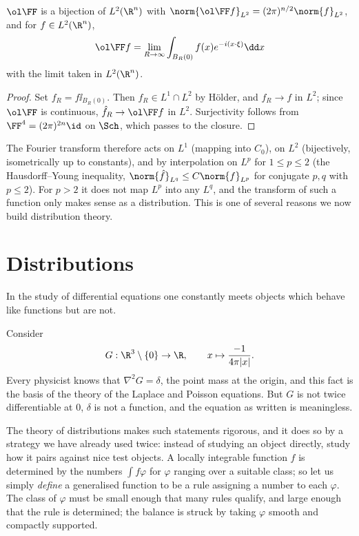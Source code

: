 \begin{proposition}
	$\ol\FF$ is a bijection of $L^2(\R^n)$ with $\norm{\ol\FF f}_{L^2}=(2\pi)^{n/2}\norm{f}_{L^2}$, and for $f \in L^2(\R^n)$,
	$$\ol\FF f = \lim_{R\to\infty}\int_{B_R(0)}f(x)e^{-i(x\cdot\xi)}\dd x$$
	with the limit taken in $L^2(\R^n)$.
\end{proposition}

\begin{proof}
	Set $f_R = f\ii_{B_R(0)}$. Then $f_R \in L^1 \cap L^2$ by H\"older, and $f_R \to f$ in $L^2$; since $\ol\FF$ is continuous, $\hat f_R \to \ol\FF f$ in $L^2$. Surjectivity follows from $\FF^4 = (2\pi)^{2n}\id$ on $\Sch$, which passes to the closure.
\end{proof}

\begin{remark}
	The Fourier transform therefore acts on $L^1$ (mapping into $C_0$), on $L^2$ (bijectively, isometrically up to constants), and by interpolation on $L^p$ for $1 \le p \le 2$ (the Hausdorff--Young inequality, $\norm{\hat f}_{L^q}\le C\norm{f}_{L^p}$ for conjugate $p,q$ with $p \le 2$). For $p > 2$ it does not map $L^p$ into any $L^q$, and the transform of such a function only makes sense as a distribution. This is one of several reasons we now build distribution theory.
\end{remark}

\section{Distributions}\label{sec:dist}

In the study of differential equations one constantly meets objects which behave like functions but are not.

\begin{example}\label{ex:greenmotivation}
	Consider
	$$G : \R^3\setminus\{0\}\to\R, \qquad x \mapsto \frac{-1}{4\pi|x|}.$$
	Every physicist knows that $\nabla^2 G = \delta$, the point mass at the origin, and this fact is the basis of the theory of the Laplace and Poisson equations. But $G$ is not twice differentiable at $0$, $\delta$ is not a function, and the equation as written is meaningless.
\end{example}

The theory of distributions makes such statements rigorous, and it does so by a strategy we have already used twice: instead of studying an object directly, study how it pairs against nice test objects. A locally integrable function $f$ is determined by the numbers $\int f\varphi$ for $\varphi$ ranging over a suitable class; so let us simply \emph{define} a generalised function to be a rule assigning a number to each $\varphi$. The class of $\varphi$ must be small enough that many rules qualify, and large enough that the rule is determined; the balance is struck by taking $\varphi$ smooth and compactly supported.

